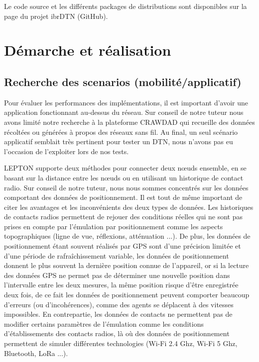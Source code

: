 \documentclass[a4paper,10pt]{article}
\begin{document}
Le code source et les différents packages de distributions sont disponibles sur la  page du projet ibrDTN (GitHub).


\section {Démarche et réalisation}

\subsection {Recherche des scenarios (mobilité/applicatif)}


Pour évaluer les performances des implémentations, il est important d'avoir une application fonctionnant au-dessus du réseau.
Sur conseil de notre tuteur nous avons limité notre recherche à la plateforme CRAWDAD qui recueille des données récoltées ou générées à propos des réseaux sans fil.
Au final, un seul scénario applicatif semblait très pertinent pour tester un DTN, nous n'avons pas eu l'occasion de l'exploiter lors de nos tests.

LEPTON supporte deux méthodes pour connecter deux nœuds ensemble, en se basant sur la distance entre les nœuds ou en utilisant un historique de contact radio.
Sur conseil de notre tuteur, nous nous sommes concentrés sur les données comportant des données de positionnement.
Il est tout de même important de citer les avantages et les inconvénients des deux types de données.
Les historiques de contacts radios permettent de rejouer des conditions réelles qui ne sont pas prises en compte par l'émulation par positionnement comme les aspects topographiques (ligne de vue, réflexions, atténuation ...).
De plus, les données de positionnement étant souvent réalisés par GPS sont d'une précision limitée et d'une période de rafraîchissement variable, 
les données de positionnement donnent le plus souvent la dernière position connue de l'appareil, 
or si la lecture des données GPS ne permet pas de déterminer une nouvelle position dans l'intervalle entre les deux mesures, la même position risque d'être enregistrée deux fois,
de ce fait les données de positionnement peuvent comporter beaucoup d'erreurs (ou d'incohérences), comme des agents se déplacent à des vitesses impossibles.
En contrepartie, les données de contacts ne permettent pas de modifier certains paramètres de l'émulation comme les conditions d'établissements des contacts radios,
là où des données de positionnement permettent de simuler différentes technologies (Wi-Fi 2.4 Ghz, Wi-Fi 5 Ghz, Bluetooth, LoRa ...).
\end{document}
